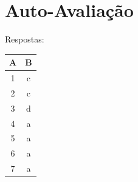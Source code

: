 \documentclass[12pt]{article}
\begin{document}
\nocite{*}



\newpage
\section*{Auto-Avaliação}

Respostas:

\begin{table}[H]
      \begin{tabular}{|c|c|} \hline
      \textbf{A} & \textbf{B}\\
      \hline
      1 & c \\ \hline
      2 & c \\ \hline
      3 & d \\ \hline
      4 & a \\ \hline
      5 & a \\ \hline
      6 & a \\ \hline
      7 & a \\ \hline
      \end{tabular}
\end{table}
\end{document}
